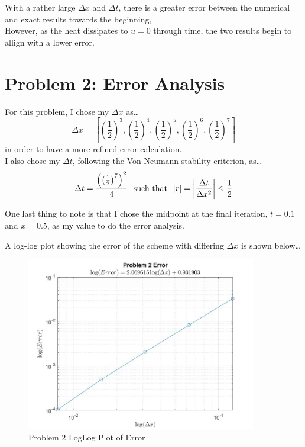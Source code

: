 \documentclass[12pt,letterpaper]{article}
\begin{document}
With a rather large $\Delta x$ and $\Delta t$, there is a greater error between the numerical and exact results towards the beginning, \\ 
However, as the heat dissipates to $u=0$ through time, the two results begin to allign with a lower error.

\section*{Problem 2: Error Analysis}

For this problem, I chose my $\Delta x$ as\ldots
\begin{equation*}
    \Delta x = \left[ \left(\frac{1}{2}\right)^{3}, \left(\frac{1}{2}\right)^{4}, \left(\frac{1}{2}\right)^{5}, \left(\frac{1}{2}\right)^{6}, \left(\frac{1}{2}\right)^{7} \right] 
\end{equation*}
in order to have a more refined error calculation.
\\

I also chose my $\Delta t$, following the Von Neumann stability criterion, as\ldots
\begin{equation*}
    \Delta t = \frac{\left(\left(\frac{1}{2}\right)^{7}\right)^2}{4} \text{\hspace{0.25cm}such that\hspace{0.25cm}} |r| = \left\lvert \frac{\Delta t}{\Delta x^2}\right\rvert   \leq  \frac{1}{2}
\end{equation*}

One last thing to note is that I chose the midpoint at the final iteration, $t=0.1$ and $x = 0.5$, as my value to do the error analysis.

A log-log plot showing the error of the scheme with differing $\Delta x$ is shown below\ldots

\begin{figure}[!h]
    \centering
    \includegraphics[width = 0.9\textwidth]{Problem2_b.jpg}

    \caption{Problem 2 LogLog Plot of Error}

\end{figure}
\end{document}
